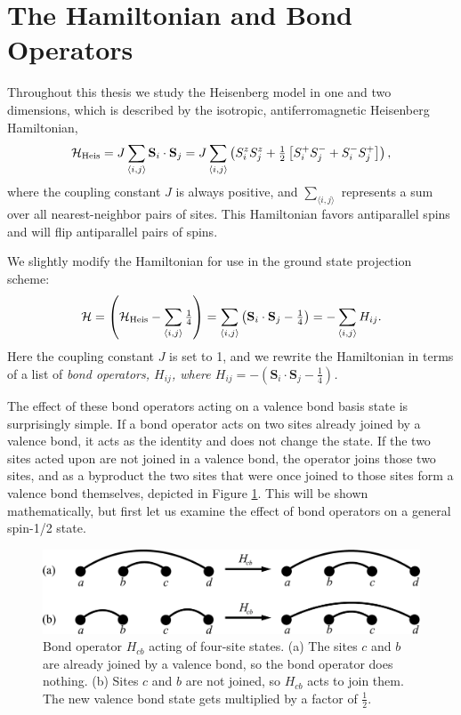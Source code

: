 \section{The Hamiltonian and Bond Operators}
Throughout this thesis we study the Heisenberg model in one and two dimensions, which is
described by the isotropic, antiferromagnetic Heisenberg Hamiltonian,
\begin{equation}
\mathcal{H}_{\rm{Heis}}=J\sum_{\langle i,j \rangle} \mathbf{S}_i\cdot \mathbf{S}_j
= J\sum_{\langle i,j \rangle}
	\left( S_i^z S_j^z + \tfrac{1}{2}\left[ S_i^+ S_j^- + S_i^- S_j^+ \right]\right),
\end{equation}
where the coupling constant $J$ is always positive, and $\sum_{\langle i,j \rangle}$ 
represents a sum over all nearest-neighbor pairs of sites.  
This Hamiltonian favors antiparallel spins and will flip antiparallel pairs of spins.

We slightly modify the Hamiltonian for use in the ground state projection scheme:
\begin{equation}
\mathcal{H}= \left(\mathcal{H}_{\rm{Heis}} - \sum_{\langle i,j \rangle} \tfrac{1}{4} \right)= \sum_{\langle i,j \rangle} 
	\left(\mathbf{S}_i\cdot \mathbf{S}_j - \tfrac{1}{4}\right)
	= - \sum_{\langle i,j \rangle} H_{ij}.
\label{hammm}
\end{equation}
Here the coupling constant $J$ is set to 1, and we rewrite the Hamiltonian in terms of a list of
\it{bond operators}, \rm $H_{ij}$, where 
$H_{ij}=-\left(\mathbf{S}_i\cdot \mathbf{S}_j - \tfrac{1}{4}\right)$.

The effect of these bond operators acting on a valence bond basis state is 
surprisingly simple.  If a bond operator acts on two sites already joined by a valence
bond, it acts as the identity and does not change the state.  If the two sites acted upon are 
not joined in a valence bond, the operator joins those two sites, and as a byproduct the 
two sites that were once joined to those sites form a valence bond themselves, depicted in Figure \ref{bopfig}.
This will be shown mathematically, but first let us examine the effect of bond operators
on a general spin-1/2 state.
\begin{figure}
\includegraphics[width=6.3in]{./figures/made/bop.pdf}
\caption[Bond operator acting on four-site states]{
	Bond operator $H_{cb}$ acting of four-site states.
	(a) The sites $c$ and $b$ are already joined by a valence bond, so the bond operator does nothing.
	(b) Sites $c$ and $b$ are not joined, so $H_{cb}$ acts to join them.  The new valence bond state gets multiplied by a factor of $\frac{1}{2}$. 
 \label{bopfig}
}
\end{figure}

